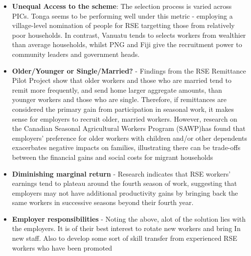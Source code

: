 \documentclass[9pt,a4paper,twocolumn,twoside]{tau-class/tau}
\begin{document}
\begin{itemize}
        \item \textbf{Unequal Access to the scheme}: The selection process is varied across PICs. Tonga seems to be performing well under this metric - employing  a village-level nomination of people for RSE targetting those from relatively poor households. In contrast, Vanuatu tends to selects workers from wealthier than average households, whilst PNG and Fiji give the recruitment power to community leaders and government heads.
        
        

       \item \textbf{Older/Younger or Single/Married?} - Findings from the RSE Remittance Pilot Project show that older workers and those who are married tend to remit more frequently, and send home larger aggregate amounts, than younger workers and those who are single. Therefore, if remittances are considered the primary gain from participation in seasonal work, it makes sense for employers to recruit older, married workers. However, research on the Canadian Seasonal Agricultural Workers Program (SAWP)has found that employers’ preference for older workers with children and/or other dependents exacerbates negative impacts on families, illustrating there can be trade-offs between the financial gains and social costs for migrant households     

    \item \textbf{Diminishing marginal return} - Research indicates that RSE workers’ earnings tend to plateau around the fourth season of work, suggesting that employers may not have additional productivity gains by bringing back the same workers in successive seasons beyond their fourth year.



    \item \textbf{Employer responsibilities} - Noting the above, alot of the solution lies with the employers. It is of their best interest to rotate new workers and bring In new staff. Also to develop some sort of skill transfer from experienced RSE workers who have been promoted




        \end{itemize}
         
\end{document}
